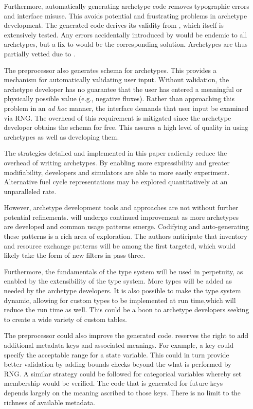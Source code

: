 Furthermore, automatically generating archetype code removes typographic errors and 
\cyclus interface misuse. This avoids potential and frustrating problems in 
archetype development. The 
generated code derives its validity from \cycpp, which itself is extensively 
tested. Any errors accidentally introduced by \cycpp would be endemic to all archetypes, 
but a fix to \cycpp would be the corresponding solution. Archetypes are thus 
partially vetted due to \cycpp.

The preprocessor also generates schema for archetypes. This provides a mechanism 
for automatically validating user input.  Without validation, the archetype 
developer has no guarantee that the user has entered a meaningful or physically possible 
value (e.g., negative fluxes). Rather than approaching this problem in an
\emph{ad hoc} 
manner, the \cyclus interface demands that user input be examined via \gls{RNG}.  The overhead 
of this requirement is mitigated since the archetype developer obtains the schema
for free. This assures a high level of quality in using archetypes as well as 
developing them.

The strategies detailed and implemented in this paper radically
reduce the overhead of writing archetypes. By enabling more expressibility and greater
modifiability, developers and simulators are able to more easily experiment.  
Alternative fuel cycle representations may be explored quantitatively at an
unparalleled rate.

However, archetype development tools and approaches are not without further 
potential refinements. \cycpp will undergo continued improvement 
as more archetypes are developed and common usage patterns emerge. Codifying and 
auto-generating these patterns is a rich area of exploration. The authors anticipate 
that inventory and resource exchange patterns will be among the first
targeted, 
which would likely take the form of new filters in pass three.

Furthermore, the fundamentals of the \cyclus type system will be used in 
perpetuity, as enabled by the extensibility of the type system.  More types
will be added as needed by the archetype developers.  It is also possible to 
make the type system dynamic, allowing for custom types to be implemented at run time,which will reduce the run time as well.
This could be a boon to archetype developers seeking to create a wide variety of custom
tables.

The preprocessor could also improve the generated code. \Cyclus reserves the right
to add additional metadata keys and associated meanings.  For example, a 
key could specify the acceptable range for a state variable. This could in turn 
provide better validation by adding bounds checks beyond the what is performed
by \gls{RNG}. A similar strategy could be followed for categorical variables whereby
set membership would be verified. The code that is generated for future keys 
depends largely on the meaning ascribed to those keys. There is no limit 
to the richness of available metadata.

